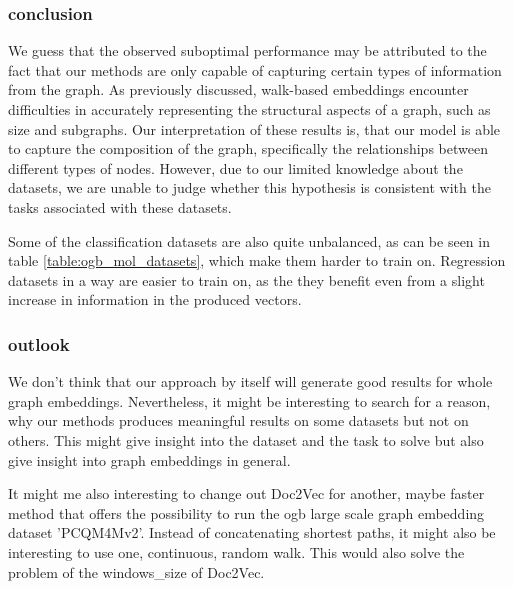 \subsubsection{conclusion}
We guess that the observed suboptimal performance may be attributed to the fact that our methods are only capable of capturing certain types of information from the graph. As previously discussed, walk-based embeddings encounter difficulties in accurately representing the structural aspects of a graph, such as size and subgraphs. Our interpretation of these results is, that our model is able to capture the composition of the graph, specifically the relationships between different types of nodes. However, due to our limited knowledge about the datasets, we are unable to judge whether this hypothesis is consistent with the tasks associated with these datasets.

Some of the classification datasets are also quite unbalanced, as can be seen in table \ref{table:ogb_mol_datasets}, which make them harder to train on. Regression datasets in a way are easier to train on, as the they benefit even from a slight increase in information in the produced vectors.

\subsubsection{outlook}
We don't think that our approach by itself will generate good results for whole graph embeddings. Nevertheless, it might be interesting to search for a reason, why our methods produces meaningful results on some datasets but not on others. This might give insight into the dataset and the task to solve but also give insight into graph embeddings in general.

It might me also interesting to change out Doc2Vec for another, maybe faster method that offers the possibility to run the ogb large scale graph embedding dataset 'PCQM4Mv2'. Instead of concatenating shortest paths, it might also be interesting to use one, continuous, random walk. This would also solve the problem of the windows\_size of Doc2Vec.

